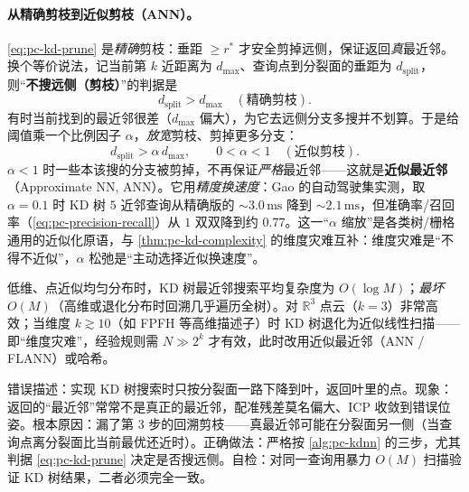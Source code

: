 \paragraph{从精确剪枝到近似剪枝（ANN）。}
\cref{eq:pc-kd-prune} 是\emph{精确}剪枝：垂距 $\ge r^\ast$ 才安全剪掉远侧，保证返回\emph{真}最近邻。换个等价说法，记当前第 $k$ 近距离为 $d_{\max}$、查询点到分裂面的垂距为 $d_{\text{split}}$，则“\textbf{不搜远侧（剪枝）}”的判据是
\begin{equation}
  d_{\text{split}}>d_{\max}\quad(\text{精确剪枝}).
  \label{eq:pc-kd-exactprune}
\end{equation}
有时当前找到的最近邻很差（$d_{\max}$ 偏大），为它去远侧分支多搜并不划算。于是给阈值乘一个比例因子 $\alpha$，\emph{放宽}剪枝、剪掉更多分支\cite{gao2023slamad}：
\begin{equation}
  d_{\text{split}}>\alpha\,d_{\max},\qquad 0<\alpha<1\quad(\text{近似剪枝}).
  \label{eq:pc-kd-approx}
\end{equation}
$\alpha<1$ 时一些本该搜的分支被剪掉，不再保证\emph{严格}最近邻——这就是\textbf{近似最近邻}（Approximate NN, ANN）。它用\emph{精度换速度}：Gao 的自动驾驶集实测，取 $\alpha=0.1$ 时 KD 树 $5$ 近邻查询从精确版的 $\sim3.0\,\mathrm{ms}$ 降到 $\sim2.1\,\mathrm{ms}$，但准确率/召回率（\cref{eq:pc-precision-recall}）从 $1$ 双双降到约 $0.77$。这一“$\alpha$ 缩放”是各类树/栅格通用的近似化原语，与 \cref{thm:pc-kd-complexity} 的维度灾难互补：维度灾难是“不得不近似”，$\alpha$ 松弛是“主动选择近似换速度”。

\begin{theorem}[KD 树搜索复杂度]\label{thm:pc-kd-complexity}
低维、点近似均匀分布时，KD 树最近邻搜索平均复杂度为 $O(\log M)$；\emph{最坏} $O(M)$（高维或退化分布时回溯几乎遍历全树）。对 $\mathbb{R}^3$ 点云（$k=3$）非常高效；当维度 $k\gtrsim10$（如 FPFH 等高维描述子）时 KD 树退化为近似线性扫描——即“维度灾难”，经验规则需 $N\gg2^k$ 才有效，此时改用近似最近邻（ANN / FLANN）或哈希。
\end{theorem}

\begin{pitfall}
错误描述：实现 KD 树搜索时只按分裂面一路下降到叶，返回叶里的点。现象：返回的“最近邻”常常不是真正的最近邻，配准残差莫名偏大、ICP 收敛到错误位姿。根本原因：漏了第 3 步的回溯剪枝——真最近邻可能在分裂面另一侧（当查询点离分裂面比当前最优还近时）。正确做法：严格按 \cref{alg:pc-kdnn} 的三步，尤其判据 \cref{eq:pc-kd-prune} 决定是否搜远侧。自检：对同一查询用暴力 $O(M)$ 扫描验证 KD 树结果，二者必须完全一致。
\end{pitfall}


